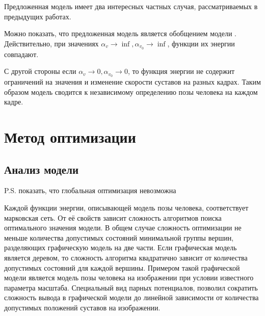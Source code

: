 Предложенная модель имеет два интересных частных случая, рассматриваемых в предыдущих работах.

Можно показать, что предложенная модель является обобщением модели \cite{park2011n}. Действительно, при значениях $\alpha_v \rightarrow \inf, \alpha_{v_0} \rightarrow \inf$, функции их энергии совпадают.

С другой стороны если $\alpha_v \rightarrow 0, \alpha_{v_0} \rightarrow 0$, то функция энергии не содержит ограничений на значения и изменение скорости суставов на разных кадрах. Таким образом модель сводится к независимому определению позы человека на каждом кадре.

\section{Метод оптимизации}

\subsection{Анализ модели} P.S. показать, что глобальная оптимизация невозможна

Каждой функции энергии, описывающей модель позы человека, соответствует марковская сеть. От её свойств зависит сложность алгоритмов поиска оптимального значения модели. В общем случае сложность оптимизации не меньше количества допустимых состояний минимальной группы вершин, разделяющих графическую модель на две части. Если графическая модель является деревом, то сложность алгоритма квадратично зависит от количества допустимых состояний для каждой вершины. Примером такой графической модели является модель позы человека на изображении при условии известного параметра масштаба. Специальный вид парных потенциалов, позволил сократить сложность вывода в графической модели до линейной зависимости от количества допустимых положений суставов на изображении.

